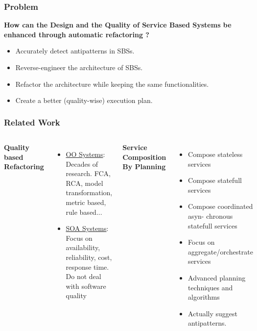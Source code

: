 \documentclass{beamer}
\begin{document}
\begin{frame}
\frametitle{Problem}
\textbf{How can the Design and the Quality of Service Based Systems be enhanced through automatic refactoring ?}
\vspace{0.5cm}
\begin{itemize}
\item Accurately detect antipatterns in SBSs.
\item Reverse-engineer the architecture of SBSs.
\item Refactor the architecture while keeping the same functionalities.
\item Create a better (quality-wise) execution plan.
\end{itemize}

\end{frame}

\begin{frame}
\frametitle{Related Work}
\begin{columns}[c] %

\textbf{Quality based Refactoring}
\begin{itemize}
\item \underline{OO Systems}: \hfill \\ Decades of research. FCA, RCA, model transformation, metric based, rule based...
\item \underline{SOA Systems}: \hfill \\ Focus on availability, reliability, cost, response time. \\ Do not deal with software quality
\end{itemize}

\textbf{Service Composition By Planning}
\begin{itemize}
\item Compose stateless services
\item Compose statefull services
\item Compose coordinated asyn-
chronous statefull services
\item Focus on aggregate/orchestrate services
\item Advanced planning techniques and algorithms
\item Actually suggest antipatterns.
\end{itemize}
\end{columns}
\vspace{1.5cm}
\end{frame}
\end{document}
